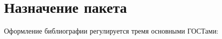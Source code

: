 \documentclass[10pt,a4paper,headings=small,numbers=enddot,english,russian]{ltxdockit}
\newcommand*{\biber}{Biber\xspace}
\newcommand*{\biblatex}{Biblatex\xspace}
\begin{document}
%
%

\section{Назначение пакета}
\label{sec:whatfor}

Оформление библиографии регулируется тремя основными ГОСТами:
\end{document}
